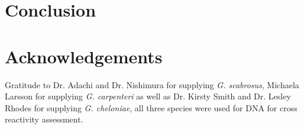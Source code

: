 \documentclass[12pt]{article}
\begin{document}
\section*{Conclusion}
\section*{Acknowledgements}
Gratitude to Dr. Adachi and Dr. Nishimura for supplying \emph{G. scabrosus}, Michaela Larsson for supplying \emph{G. carpenteri} as well as Dr. Kirsty Smith and Dr. Lesley Rhodes for supplying \emph{G. cheloniae}, all three species were used for DNA for cross reactivity assessment. 
\FloatBarrier
\newpage


\end{document}
